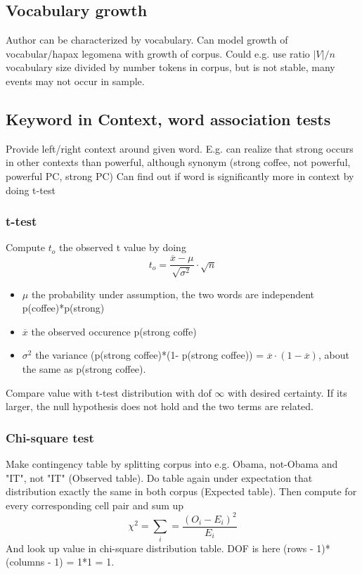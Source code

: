 \documentclass[11pt]{article}
\begin{document}
\subsection{Vocabulary growth}
Author can be characterized by vocabulary. Can model growth of vocabular/hapax legomena with growth of corpus.
Could e.g. use ratio $|V|/n$ vocabulary size divided by number tokens in corpus, but
is not stable, many events may not occur in sample. 

\subsection{Keyword in Context, word association tests}
Provide left/right context around given word. E.g. can realize that strong occurs in other contexts
than powerful, although synonym (strong coffee, not powerful, powerful PC, strong PC)
Can find out if word is significantly more in context by doing t-test

\subsubsection{t-test}
Compute $t_o$ the observed t value by doing
\begin{equation}
	t_o = \frac{\overline{x} - \mu}{\sqrt{\sigma^2}}\cdot \sqrt{n}
\end{equation}
\begin{itemize}
	\item $\mu$ the probability under assumption, the two words are independent p(coffee)*p(strong)
	\item $\overline{x}$ the observed occurence p(strong coffe)
	\item $\sigma^2$ the variance (p(strong coffee)*(1- p(strong coffee)) = 
	$\overline{x}\cdot (1- \overline{x})$, about the same as p(strong coffee).
\end{itemize}
Compare value with t-test distribution with dof $\infty$ with desired certainty. If its larger, the
null hypothesis does not hold and the two terms are related.

\subsubsection{Chi-square test}
Make contingency table by splitting corpus into e.g. Obama, not-Obama and "IT", not "IT" (Observed table).
Do table again under expectation that distribution exactly the same in both corpus (Expected table). 
Then compute for every corresponding cell pair and sum up
\begin{equation}
	\chi^2 = \sum_i = \frac{(O_i - E_i)^2}{E_i}
\end{equation}
And look up value in chi-square distribution table. DOF is here (rows - 1)*(columns - 1) = 1*1 = 1.
\end{document}
